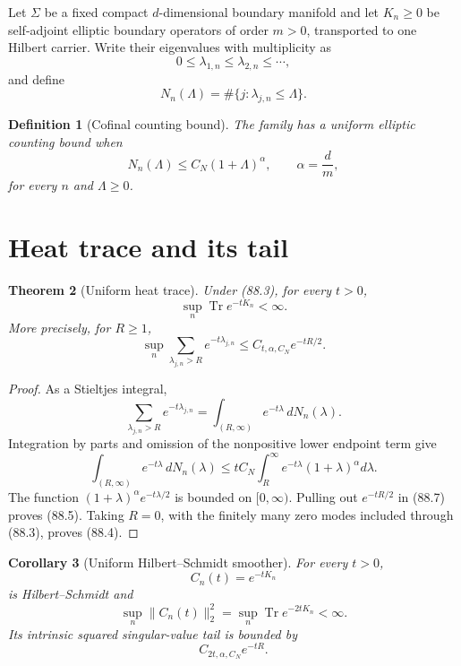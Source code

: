 \documentclass[11pt]{article}
\newtheorem{theorem}{Theorem}[section]
\newtheorem{corollary}[theorem]{Corollary}
\newtheorem{definition}[theorem]{Definition}
\theoremstyle{remark}
\begin{document}
Let \(\Sigma\) be a fixed compact \(d\)-dimensional boundary
manifold and let \(K_n\geq0\) be self-adjoint elliptic boundary
operators of order \(m>0\), transported to one Hilbert carrier.
Write their eigenvalues with multiplicity as
\[
 0\leq\lambda_{1,n}\leq\lambda_{2,n}\leq\cdots,       \tag{88.1}
\]
and define
\[
 N_n(\Lambda)=\#\{j:\lambda_{j,n}\leq\Lambda\}.        \tag{88.2}
\]

\begin{definition}[Cofinal counting bound]
\label{def:v15v88-count}
The family has a uniform elliptic counting bound when
\[
 N_n(\Lambda)\leq C_N(1+\Lambda)^\alpha,\qquad
 \alpha=\frac dm,                                     \tag{88.3}
\]
for every \(n\) and \(\Lambda\geq0\).
\end{definition}

\section{Heat trace and its tail}

\begin{theorem}[Uniform heat trace]
\label{thm:v15v88-heat-trace}
Under (88.3), for every \(t>0\),
\[
 \sup_n\operatorname{Tr}e^{-tK_n}<\infty.             \tag{88.4}
\]
More precisely, for \(R\geq1\),
\[
 \sup_n
 \sum_{\lambda_{j,n}>R}e^{-t\lambda_{j,n}}
 \leq
 C_{t,\alpha,C_N}e^{-tR/2}.                           \tag{88.5}
\]
\end{theorem}

\begin{proof}
As a Stieltjes integral,
\[
 \sum_{\lambda_{j,n}>R}e^{-t\lambda_{j,n}}
 =
 \int_{(R,\infty)}e^{-t\lambda}\,dN_n(\lambda).
                                                               \tag{88.6}
\]
Integration by parts and omission of the nonpositive lower
endpoint term give
\[
 \int_{(R,\infty)}e^{-t\lambda}\,dN_n(\lambda)
 \leq
 tC_N\int_R^\infty e^{-t\lambda}(1+\lambda)^\alpha
 d\lambda.                                             \tag{88.7}
\]
The function
\((1+\lambda)^\alpha e^{-t\lambda/2}\) is bounded on
\([0,\infty)\).  Pulling out \(e^{-tR/2}\) in (88.7) proves
(88.5).  Taking \(R=0\), with the finitely many zero modes included
through (88.3), proves (88.4).
\end{proof}

\begin{corollary}[Uniform Hilbert--Schmidt smoother]
\label{cor:v15v88-hs}
For every \(t>0\),
\[
 C_n(t)=e^{-tK_n}
\]
is Hilbert--Schmidt and
\[
 \sup_n\|C_n(t)\|_2^2
 =
 \sup_n\operatorname{Tr}e^{-2tK_n}<\infty.            \tag{88.8}
\]
Its intrinsic squared singular-value tail is bounded by
\[
 C_{2t,\alpha,C_N}e^{-tR}.                            \tag{88.9}
\]
\end{corollary}
\end{document}
